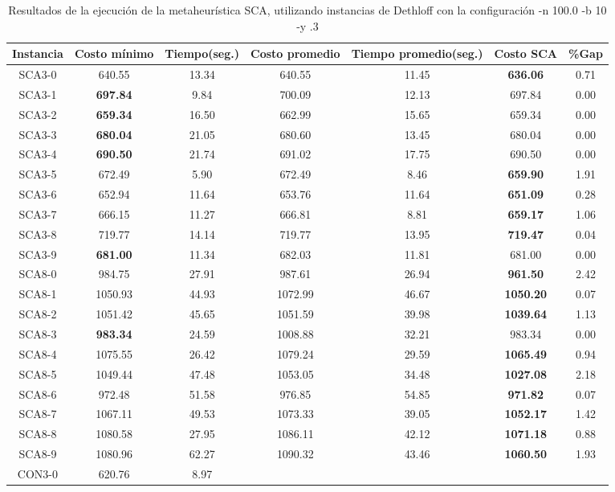 \begin{table}[ht]
\caption{Resultados de la ejecución de la metaheurística SCA, utilizando instancias de Dethloff con la configuración -n 100.0 -b 10 -y .3}
\centering
\small
\begin{tabular}{c c c c c c c}
\hline\hline
Instancia & Costo mínimo & Tiempo(seg.) & Costo promedio & Tiempo promedio(seg.) & Costo SCA & \%Gap \\ [0.5ex]
\hline
SCA3-0 & 640.55 & 13.34 & 
640.55 & 11.45 & \bf{636.06} & 
0.71\\SCA3-1 & \bf{697.84} & 9.84 & 
700.09 & 12.13 & 697.84 & 0.00\\
SCA3-2 & \bf{659.34} & 16.50 & 
662.99 & 15.65 & 659.34 & 0.00\\
SCA3-3 & \bf{680.04} & 21.05 & 
680.60 & 13.45 & 680.04 & 0.00\\
SCA3-4 & \bf{690.50} & 21.74 & 
691.02 & 17.75 & 690.50 & 0.00\\
SCA3-5 & 672.49 & 5.90 & 
672.49 & 8.46 & \bf{659.90} & 
1.91\\SCA3-6 & 652.94 & 11.64 & 
653.76 & 11.64 & \bf{651.09} & 
0.28\\SCA3-7 & 666.15 & 11.27 & 
666.81 & 8.81 & \bf{659.17} & 
1.06\\SCA3-8 & 719.77 & 14.14 & 
719.77 & 13.95 & \bf{719.47} & 
0.04\\SCA3-9 & \bf{681.00} & 11.34 & 
682.03 & 11.81 & 681.00 & 0.00\\
SCA8-0 & 984.75 & 27.91 & 
987.61 & 26.94 & \bf{961.50} & 
2.42\\SCA8-1 & 1050.93 & 44.93 & 
1072.99 & 46.67 & \bf{1050.20} & 
0.07\\SCA8-2 & 1051.42 & 45.65 & 
1051.59 & 39.98 & \bf{1039.64} & 
1.13\\SCA8-3 & \bf{983.34} & 24.59 & 
1008.88 & 32.21 & 983.34 & 0.00\\
SCA8-4 & 1075.55 & 26.42 & 
1079.24 & 29.59 & \bf{1065.49} & 
0.94\\SCA8-5 & 1049.44 & 47.48 & 
1053.05 & 34.48 & \bf{1027.08} & 
2.18\\SCA8-6 & 972.48 & 51.58 & 
976.85 & 54.85 & \bf{971.82} & 
0.07\\SCA8-7 & 1067.11 & 49.53 & 
1073.33 & 39.05 & \bf{1052.17} & 
1.42\\SCA8-8 & 1080.58 & 27.95 & 
1086.11 & 42.12 & \bf{1071.18} & 
0.88\\SCA8-9 & 1080.96 & 62.27 & 
1090.32 & 43.46 & \bf{1060.50} & 
1.93\\CON3-0 & 620.76 & 8.97 & 

\end{tabular}
\end{table}
